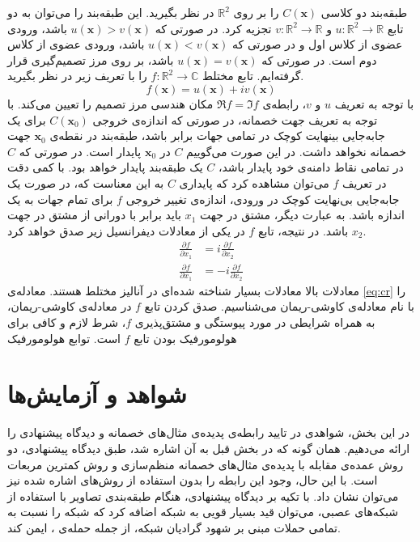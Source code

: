 \documentclass[12pt,onecolumn,a4paper]{article}
\begin{document}
طبقه‌بند دو کلاسی $C(\mathbf{x})$ را بر روی $\mathbb{R}^2$ در نظر بگیرید. این طبقه‌بند را می‌توان به دو تابع $u:\mathbb{R}^2 \rightarrow \mathbb{R}$ و $v:\mathbb{R}^2 \rightarrow \mathbb{R}$ تجزیه کرد. در صورتی که $u(\mathbf{x})>v(\mathbf{x})$ باشد، ورودی عضوی از کلاس اول و در صورتی که $u(\mathbf{x})<v(\mathbf{x})$ باشد، ورودی عضوی از کلاس دوم است. در صورتی که $u(\mathbf{x})=v(\mathbf{x})$ باشد، بر روی مرز تصمیم‌گیری قرار گرفته‌ایم. تابع مختلط $f:\mathbb{R}^2 \rightarrow \mathbb{C}$ را با تعریف زیر در نظر بگیرید.
\begin{equation}
    f(\mathbf{x})=u(\mathbf{x})+iv(\mathbf{x})
\end{equation}
با توجه به تعریف $u$ و $v$، رابطه‌ی $\Re f = \Im f$ مکان هندسی مرز تصمیم را تعیین می‌کند. با توجه به تعریف جهت خصمانه، در صورتی که اندازه‌ی خروجی $C(\mathbf{x}_0)$ برای یک جابه‌جایی بینهایت کوچک در تمامی جهات برابر باشد، طبقه‌بند در نقطه‌ی $\mathbf{x}_0$ جهت خصمانه نخواهد داشت. در این صورت می‌گوییم $C$ در $\mathbf{x}_0$ پایدار است. در صورتی که $C$ در تمامی نقاط دامنه‌ی خود پایدار باشد، $C$ یک طبقه‌بند پایدار خواهد بود. با کمی دقت در تعریف $f$ می‌توان مشاهده کرد که پایداری $C$ به این معناست که، در صورت یک جابه‌جایی بی‌نهایت کوچک در ورودی، اندازه‌ی تغییر خروجی $f$ برای تمام جهات به یک اندازه باشد. به عبارت دیگر، مشتق در جهت $x_1$ باید برابر با دورانی از مشتق در جهت $x_2$ باشد. در نتیجه، تابع $f$ در یکی از معادلات دیفرانسیل زیر صدق خواهد کرد.
\begin{align}
    \frac{\partial f}{\partial x_1} &= i\frac{\partial f}{\partial x_2} \label{eq:cr}\\
    \frac{\partial f}{\partial x_1} &= -i\frac{\partial f}{\partial x_2}
\end{align}
معادلات بالا معادلات بسیار شناخته شده‌ای در آنالیز مختلط هستند. معادله‌ی \ref{eq:cr} را با نام معادله‌ی کاوشی-ریمان می‌شناسیم. صدق کردن تابع $f$ در معادله‌ی کاوشی-ریمان، به همراه شرایطی در مورد پیوستگی و مشتق‌پذیری $f$، شرط لازم و کافی برای هولومورفیک بودن تابع $f$ است. توابع هولومورفیک

\section{شواهد و آزمایش‌ها}
در این بخش، شواهدی در تایید رابطه‌ی پدیده‌ی مثال‌های خصمانه و دیدگاه پیشنهادی را ارائه می‌دهیم. همان گونه که در بخش قبل به آن اشاره شد، طبق دیدگاه پیشنهادی، دو روش عمده‌ی مقابله با پدیده‌ی مثال‌های خصمانه منظم‌سازی و روش کمترین مربعات است. با این  حال، وجود این رابطه را بدون استفاده از روش‌های اشاره شده نیز می‌توان نشان داد. با تکیه بر دیدگاه پیشنهادی، هنگام طبقه‌بندی تصاویر با استفاده از شبکه‌های عصبی، می‌توان قید بسیار قویی به شبکه اضافه کرد که شبکه را نسبت به تمامی حملات مبنی بر شهود گرادیان  شبکه، از جمله حمله‌ی ، ایمن کند.
\end{document}
